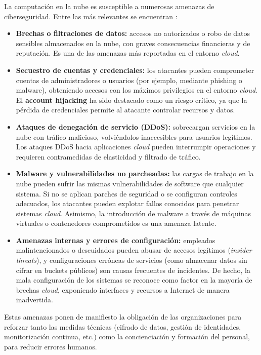\documentclass[12pt,twoside,titlepage]{report}
\begin{document}
La computación en la nube es susceptible a numerosas amenazas de ciberseguridad. Entre las más relevantes se encuentran \cite{ahmadi2024cloud}:

\begin{itemize}
\item \textbf{Brechas o filtraciones de datos:} accesos no autorizados o robo de datos sensibles almacenados en la nube, con graves consecuencias financieras y de reputación. Es una de las amenazas más reportadas en el entorno \textit{cloud}.

\item \textbf{Secuestro de cuentas y credenciales:} los atacantes pueden comprometer cuentas de administradores o usuarios (por ejemplo, mediante phishing o malware), obteniendo accesos con los máximos privilegios en el entorno \textit{cloud}. El \textbf{account hijacking} ha sido destacado como un riesgo crítico, ya que la pérdida de credenciales permite al atacante controlar recursos y datos.

\item \textbf{Ataques de denegación de servicio (DDoS):} sobrecargan servicios en la nube con tráfico malicioso, volviéndolos inaccesibles para usuarios legítimos. Los ataques DDoS hacia aplicaciones \textit{cloud} pueden interrumpir operaciones y requieren contramedidas de elasticidad y filtrado de tráfico.

\item \textbf{Malware y vulnerabilidades no parcheadas:} las cargas de trabajo en la nube pueden sufrir las mismas vulnerabilidades de software que cualquier sistema. Si no se aplican parches de seguridad o se configuran controles adecuados, los atacantes pueden explotar fallos conocidos para penetrar sistemas \textit{cloud}. Asimismo, la introducción de malware a través de máquinas virtuales o contenedores comprometidos es una amenaza latente.

\item \textbf{Amenazas internas y errores de configuración:} empleados malintencionados o descuidados pueden abusar de accesos legítimos (\textit{insider threats}), y configuraciones erróneas de servicios (como almacenar datos sin cifrar en buckets públicos) son causas frecuentes de incidentes. De hecho, la mala configuración de los sistemas se reconoce como factor en la mayoría de brechas \textit{cloud}, exponiendo interfaces y recursos a Internet de manera inadvertida.
\end{itemize}

Estas amenazas ponen de manifiesto la obligación de las organizaciones para reforzar tanto las medidas técnicas (cifrado de datos, gestión de identidades, monitorización continua, etc.) como la concienciación y formación del personal, para reducir errores humanos.
\end{document}
